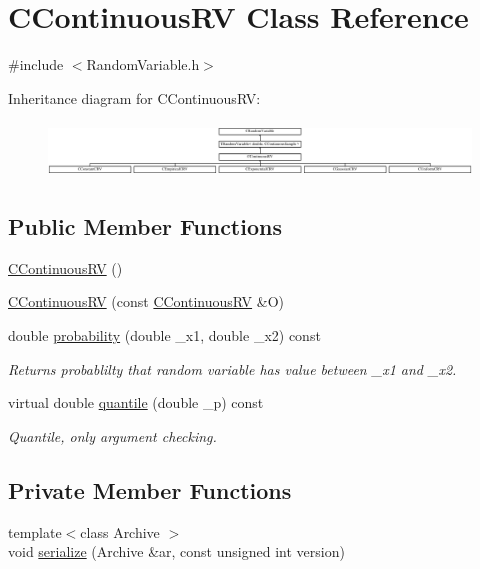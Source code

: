 \hypertarget{class_c_continuous_r_v}{\section{C\-Continuous\-R\-V Class Reference}
\label{class_c_continuous_r_v}
}


{\ttfamily \#include $<$Random\-Variable.\-h$>$}

Inheritance diagram for C\-Continuous\-R\-V\-:\begin{figure}[H]
\begin{center}
\leavevmode
\includegraphics[height=1.473684cm]{class_c_continuous_r_v}
\end{center}
\end{figure}
\subsection*{Public Member Functions}
\begin{DoxyCompactItemize}
\item 
\hyperlink{class_c_continuous_r_v_a3501c35710b9b8dea56976f2fb895a20}{C\-Continuous\-R\-V} ()
\item 
\hyperlink{class_c_continuous_r_v_a1b0b4cedcbfa308f76ebc71df0cc4429}{C\-Continuous\-R\-V} (const \hyperlink{class_c_continuous_r_v}{C\-Continuous\-R\-V} \&O)
\item 
double \hyperlink{class_c_continuous_r_v_a4cfd8083c22c2283e9246652a2f79686}{probability} (double \-\_\-x1, double \-\_\-x2) const 
\begin{DoxyCompactList}\small\item\em Returns probablilty that random variable has value between \-\_\-x1 and \-\_\-x2. \end{DoxyCompactList}\item 
virtual double \hyperlink{class_c_continuous_r_v_a14207c5f0664f1a5436acd44a21ce46f}{quantile} (double \-\_\-p) const 
\begin{DoxyCompactList}\small\item\em Quantile, only argument checking. \end{DoxyCompactList}\end{DoxyCompactItemize}
\subsection*{Private Member Functions}
\begin{DoxyCompactItemize}
\item 
{\footnotesize template$<$class Archive $>$ }\\void \hyperlink{class_c_continuous_r_v_a6de70e5300ddf0f1d1ab71e568b971e0}{serialize} (Archive \&ar, const unsigned int version)
\end{DoxyCompactItemize}
